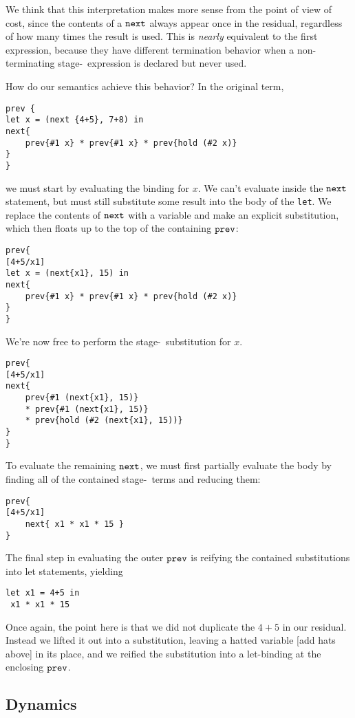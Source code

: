 We think that this interpretation makes more sense from the point of view of cost, 
since the contents of a ${\tt next}$ always appear once in the residual, regardless of how many times the result is used.  
This is \emph{nearly} equivalent to the first expression, because they have different termination behavior 
when a non-terminating stage-\bbtwo~expression is declared but never used.

How do our semantics achieve this behavior? In the original term,
\begin{lstlisting}
prev {
let x = (next {4+5}, 7+8) in
next{
	prev{#1 x} * prev{#1 x} * prev{hold (#2 x)}
}
}
\end{lstlisting}
we must start by evaluating the binding for $x$.  We can't evaluate inside the
${\tt next}$ statement, but must still substitute some result into the body of the
\texttt{let}. We replace the contents of ${\tt next}$ with a variable and make an
explicit substitution, which then floats up to the top of the containing
${\tt prev}$:
\begin{lstlisting} 
prev{
[4+5/x1]
let x = (next{x1}, 15) in
next{
	prev{#1 x} * prev{#1 x} * prev{hold (#2 x)}
}
}
\end{lstlisting}
We're now free to perform the stage-\bbone~substitution for $x$.  
\begin{lstlisting} 
prev{
[4+5/x1]
next{
	prev{#1 (next{x1}, 15)} 
	* prev{#1 (next{x1}, 15)} 
	* prev{hold (#2 (next{x1}, 15))}
}
}
\end{lstlisting}
To evaluate the remaining ${\tt next}$, we must first partially evaluate the body by finding all of the contained stage-\bbone~terms and reducing them:
\begin{lstlisting} 
prev{
[4+5/x1]
	next{ x1 * x1 * 15 }
}
\end{lstlisting}
The final step in evaluating the outer ${\tt prev}$ is reifying the contained substitutions into let statements, yielding
\begin{lstlisting} 
let x1 = 4+5 in
 x1 * x1 * 15
\end{lstlisting}

Once again, the point here is that we did not duplicate the $4+5$ in our residual.  
Instead we lifted it out into a substitution, leaving a hatted variable [\TODO add hats above] in its place,
and we reified the substitution into a let-binding at the enclosing ${\tt prev}$.

\subsection{Dynamics}

